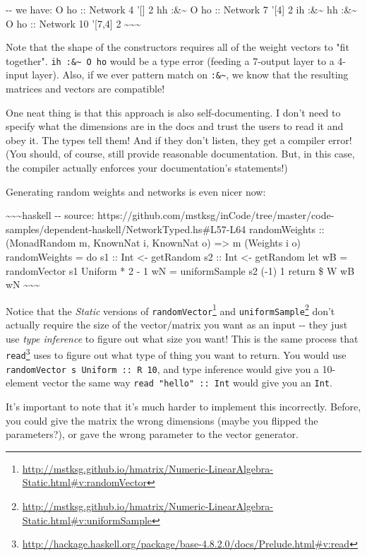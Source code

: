 \documentclass[]{article}
\renewcommand{\href}[2]{#2\footnote{\url{#1}}}
\begin{document}
-\/- we have: O ho :: Network 4 '{[}{]} 2 hh :\&\textasciitilde{} O ho ::
Network 7 '{[}4{]} 2 ih :\&\textasciitilde{} hh :\&\textasciitilde{} O ho ::
Network 10 '{[}7,4{]} 2 \textasciitilde{}\textasciitilde{}\textasciitilde{}

Note that the shape of the constructors requires all of the weight vectors to
"fit together". \texttt{ih\ :\&\textasciitilde{}\ O\ ho} would be a type error
(feeding a 7-output layer to a 4-input layer). Also, if we ever pattern match on
\texttt{:\&\textasciitilde{}}, we know that the resulting matrices and vectors
are compatible!

One neat thing is that this approach is also self-documenting. I don't need to
specify what the dimensions are in the docs and trust the users to read it and
obey it. The types tell them! And if they don't listen, they get a compiler
error! (You should, of course, still provide reasonable documentation. But, in
this case, the compiler actually enforces your documentation's statements!)

Generating random weights and networks is even nicer now:

\textasciitilde{}\textasciitilde{}\textasciitilde{}haskell -\/- source:
https://github.com/mstksg/inCode/tree/master/code-samples/dependent-haskell/NetworkTyped.hs\#L57-L64
randomWeights :: (MonadRandom m, KnownNat i, KnownNat o) =\textgreater{} m
(Weights i o) randomWeights = do s1 :: Int \textless{}- getRandom s2 :: Int
\textless{}- getRandom let wB = randomVector s1 Uniform * 2 - 1 wN =
uniformSample s2 (-1) 1 return \$ W wB wN
\textasciitilde{}\textasciitilde{}\textasciitilde{}

Notice that the \emph{Static} versions of
\href{http://mstksg.github.io/hmatrix/Numeric-LinearAlgebra-Static.html\#v:randomVector}{\texttt{randomVector}}
and
\href{http://mstksg.github.io/hmatrix/Numeric-LinearAlgebra-Static.html\#v:uniformSample}{\texttt{uniformSample}}
don't actually require the size of the vector/matrix you want as an input -\/-
they just use \emph{type inference} to figure out what size you want! This is
the same process that
\href{http://hackage.haskell.org/package/base-4.8.2.0/docs/Prelude.html\#v:read}{\texttt{read}}
uses to figure out what type of thing you want to return. You would use
\texttt{randomVector\ s\ Uniform\ ::\ R\ 10}, and type inference would give you
a 10-element vector the same way \texttt{read\ "hello"\ ::\ Int} would give you
an \texttt{Int}.

It's important to note that it's much harder to implement this incorrectly.
Before, you could give the matrix the wrong dimensions (maybe you flipped the
parameters?), or gave the wrong parameter to the vector generator.
\end{document}
